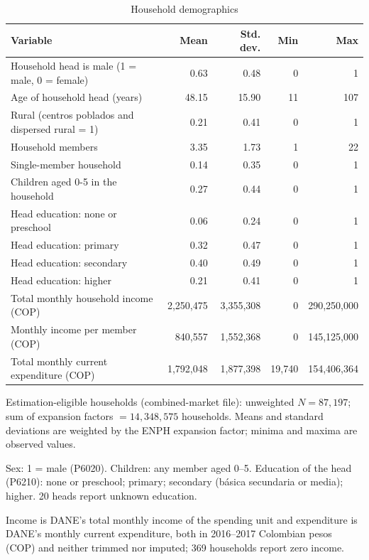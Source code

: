 \documentclass[
  11pt,
]{article}
\begin{document}
\begin{table}[!htbp]
\centering
\begin{threeparttable}
\caption{Household demographics}
\label{tab:demographics}
\small
\begin{tabular}{lrrrr}
\toprule
Variable & Mean & Std. dev. & Min & Max \\
\midrule
Household head is male (1 = male, 0 = female) & 0.63 & 0.48 & 0 & 1 \\
Age of household head (years) & 48.15 & 15.90 & 11 & 107 \\
Rural (centros poblados and dispersed rural = 1) & 0.21 & 0.41 & 0 & 1 \\
Household members & 3.35 & 1.73 & 1 & 22 \\
Single-member household & 0.14 & 0.35 & 0 & 1 \\
Children aged 0-5 in the household & 0.27 & 0.44 & 0 & 1 \\
Head education: none or preschool & 0.06 & 0.24 & 0 & 1 \\
Head education: primary & 0.32 & 0.47 & 0 & 1 \\
Head education: secondary & 0.40 & 0.49 & 0 & 1 \\
Head education: higher & 0.21 & 0.41 & 0 & 1 \\
Total monthly household income (COP) & 2,250,475 & 3,355,308 & 0 & 290,250,000 \\
Monthly income per member (COP) & 840,557 & 1,552,368 & 0 & 145,125,000 \\
Total monthly current expenditure (COP) & 1,792,048 & 1,877,398 & 19,740 & 154,406,364 \\
\bottomrule
\end{tabular}
\begin{tablenotes}[flushleft]
\footnotesize
\item Estimation-eligible households (combined-market file): unweighted $N = 87,197$; sum of expansion factors $= 14,348,575$ households. Means and standard deviations are weighted by the ENPH expansion factor; minima and maxima are observed values.
\item Sex: 1 = male (P6020). Children: any member aged 0--5. Education of the head (P6210): none or preschool; primary; secondary (b\'asica secundaria or media); higher. 20 heads report unknown education.
\item Income is DANE's total monthly income of the spending unit and expenditure is DANE's monthly current expenditure, both in 2016--2017 Colombian pesos (COP) and neither trimmed nor imputed; 369 households report zero income.
\end{tablenotes}
\end{threeparttable}
\end{table}
\end{document}
